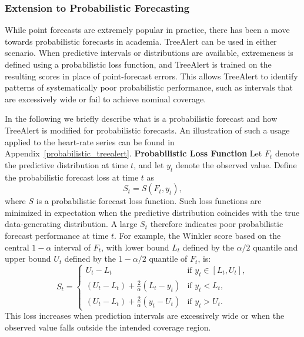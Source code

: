 \documentclass[]{interact}
\theoremstyle{plain}
\theoremstyle{definition}
\theoremstyle{remark}
\begin{document}
\subsubsection{Extension to Probabilistic Forecasting}

While point forecasts are extremely popular in practice, there has been a move towards probabilistic forecasts in academia. TreeAlert can be used in either scenario. When predictive intervals or distributions are available, extremeness is defined using a probabilistic loss function, and TreeAlert is trained on the resulting scores in place of point-forecast errors. This allows TreeAlert to identify patterns of systematically poor probabilistic performance, such as intervals that are excessively wide or fail to achieve nominal coverage.

In the following we briefly describe what is a probabilistic forecast and how TreeAlert is modified for probabilistic forecasts. An illustration of such a usage applied to the heart-rate series can be found in  Appendix~\ref{probabilistic_treealert}.
\newline
\noindent\textbf{Probabilistic Loss Function}
Let $F_t$ denote the predictive distribution at time $t$, and let $y_t$ denote the observed value.
Define the probabilistic forecast loss at time $t$ as
\begin{equation}
S_t = S(F_t, y_t),
\end{equation}
where $S$ is a probabilistic forecast loss function. Such loss functions are minimized in expectation when the predictive distribution coincides with the true data-generating distribution. A large $S_t$ therefore indicates poor probabilistic forecast performance at time $t$. For example, the Winkler score based on the central $1-\alpha$ interval of $F_t$, with lower bound $L_t$ defined by the $\alpha/2$ quantile and upper bound $U_t$ defined by the $1-\alpha/2$ quantile of $F_t$, is:
\begin{equation}
S_t =
\begin{cases}
U_t - L_t
& \text{if } y_t \in [L_t, U_t], \\[3pt]
(U_t - L_t) + \frac{2}{\alpha}(L_t - y_t)
& \text{if } y_t < L_t, \\[3pt]
(U_t - L_t) + \frac{2}{\alpha}(y_t - U_t)
& \text{if } y_t > U_t.
\end{cases}
\end{equation}
This loss increases when prediction intervals are excessively wide or
when the observed value falls outside the intended coverage region.
\newline
\end{document}
